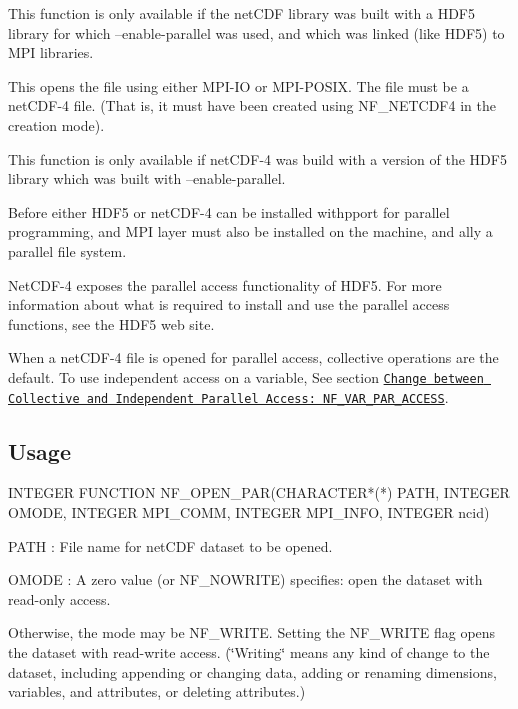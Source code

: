 This function is only available if the net\+C\+DF library was built with a H\+D\+F5 library for which –enable-\/parallel was used, and which was linked (like H\+D\+F5) to M\+PI libraries.

This opens the file using either M\+P\+I-\/\+IO or M\+P\+I-\/\+P\+O\+S\+IX. The file must be a net\+C\+D\+F-\/4 file. (That is, it must have been created using N\+F\+\_\+\+N\+E\+T\+C\+D\+F4 in the creation mode).

This function is only available if net\+C\+D\+F-\/4 was build with a version of the H\+D\+F5 library which was built with –enable-\/parallel.

Before either H\+D\+F5 or net\+C\+D\+F-\/4 can be installed withpport for parallel programming, and M\+PI layer must also be installed on the machine, and ally a parallel file system.

Net\+C\+D\+F-\/4 exposes the parallel access functionality of H\+D\+F5. For more information about what is required to install and use the parallel access functions, see the H\+D\+F5 web site.

When a net\+C\+D\+F-\/4 file is opened for parallel access, collective operations are the default. To use independent access on a variable, See section \href{#NF_005fVAR_005fPAR_005fACCESS}{\tt Change between Collective and Independent Parallel Access\+: N\+F\+\_\+\+V\+A\+R\+\_\+\+P\+A\+R\+\_\+\+A\+C\+C\+E\+SS}.

\subsection*{Usage }


\begin{DoxyCode}
INTEGER FUNCTION NF\_OPEN\_PAR(CHARACTER*(*) PATH, INTEGER OMODE,
                             INTEGER MPI\_COMM, INTEGER MPI\_INFO,
                             INTEGER ncid)
\end{DoxyCode}


{\ttfamily P\+A\+TH} \+: File name for net\+C\+DF dataset to be opened.

{\ttfamily O\+M\+O\+DE} \+: A zero value (or N\+F\+\_\+\+N\+O\+W\+R\+I\+TE) specifies\+: open the dataset with read-\/only access.

Otherwise, the mode may be N\+F\+\_\+\+W\+R\+I\+TE. Setting the N\+F\+\_\+\+W\+R\+I\+TE flag opens the dataset with read-\/write access. (\char`\"{}\+Writing\char`\"{} means any kind of change to the dataset, including appending or changing data, adding or renaming dimensions, variables, and attributes, or deleting attributes.)

